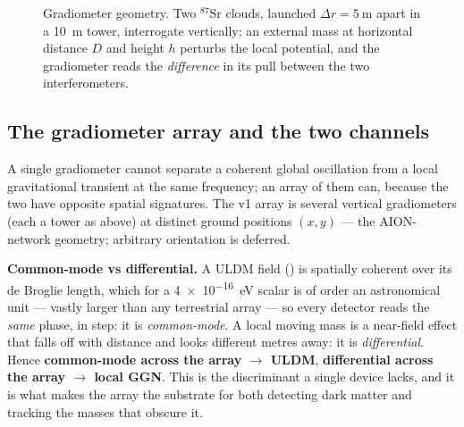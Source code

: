 \documentclass[11pt,a4paper]{article}
\theoremstyle{reqstyle}
\begin{document}
\begin{figure}[h]
\centering
{}
\caption{Gradiometer geometry. Two $^{87}$Sr clouds, launched $\Delta r=\SI{5}{\metre}$ apart
in a \SI{10}{\metre} tower, interrogate vertically; an external mass at horizontal distance
$D$ and height $h$ perturbs the local potential, and the gradiometer reads the
\emph{difference} in its pull between the two interferometers.}
\label{fig:geometry}
\end{figure}

\subsection{The gradiometer array and the two channels}
\label{sec:array}
A single gradiometer cannot separate a coherent global oscillation from a local gravitational
transient at the same frequency; an array of them can, because the two have opposite spatial
signatures. The v1 array is several vertical gradiometers (each a tower as above) at distinct
ground positions $(x,y)$ --- the AION-network geometry; arbitrary orientation is deferred.

\textbf{Common-mode vs differential.} A ULDM field () is spatially coherent
over its de Broglie length, which for a \SI{4e-16}{\electronvolt} scalar is of order an
astronomical unit --- vastly larger than any terrestrial array --- so every detector reads the
\emph{same} phase, in step: it is \emph{common-mode}. A local moving mass is a near-field
effect that falls off with distance and looks different metres away: it is \emph{differential}.
Hence \textbf{common-mode across the array $\to$ ULDM}, \textbf{differential across the array
$\to$ local GGN}. This is the discriminant a single device lacks, and it is what makes the
array the substrate for both detecting dark matter and tracking the masses that obscure it.
\end{document}
